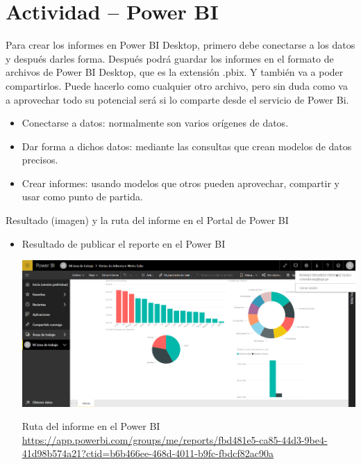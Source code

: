  \section{Actividad – Power BI} 
Para crear los informes en Power BI Desktop, primero debe conectarse a los datos y después darles forma. Después podrá guardar los informes en el formato de archivos de Power BI Desktop, que es la extensión .pbix. Y también va a poder compartirlos. Puede hacerlo como cualquier otro archivo, pero sin duda como va a aprovechar todo su potencial será si lo comparte desde el servicio de Power Bi.
\begin{itemize}
	\item Conectarse a datos: normalmente son varios orígenes de datos.
	\item Dar forma a dichos datos: mediante las consultas que crean modelos de datos precisos.
	\item Crear informes: usando modelos que otros pueden aprovechar, compartir y usar como punto de partida.\\
\end{itemize} 

Resultado (imagen) y la ruta del informe en el Portal de Power BI 
\begin{itemize}
	\item Resultado de publicar el reporte en el Power BI
	\begin{center}
	\includegraphics[width=16cm]{./Imagenes/img1} 
	\end{center}
Ruta del informe en el Power BI
\\
\url{https://app.powerbi.com/groups/me/reports/fbd481e5-ca85-44d3-9be4-41d98b574a21?ctid=b6b466ee-468d-4011-b9fc-fbdcf82ac90a} 
\end{itemize} 